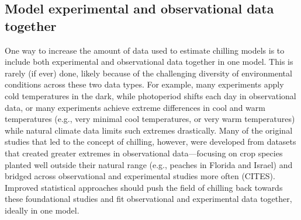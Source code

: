 \documentclass[11pt]{article}
\begin{document}
\subsection*{Model experimental and observational data together} 
One way to increase the amount of data used to estimate chilling models is to include both experimental and observational data together in one model. This is rarely (if ever) done, likely because of the challenging diversity of environmental conditions across these two data types. For example, many experiments apply cold temperatures in the dark, while photoperiod shifts each day in observational data, or many experiments achieve extreme differences in cool and warm temperatures (e.g., very minimal cool temperatures, or very warm temperatures) while natural climate data limits such extremes drastically. Many of the original studies that led to the concept of chilling, however, were developed from datasets that created greater extremes in observational data---focusing on crop species planted well outside their natural range (e.g., peaches in Florida and Israel) and bridged across observational and experimental studies more often (CITES). Improved statistical approaches should push the field of chilling back towards these foundational studies and fit observational and experimental data together, ideally in one model. 
\end{document}
